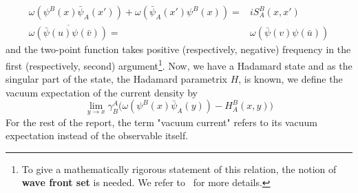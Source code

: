 \begin{equation}\label{vacuum-hadamardcond}
\begin{split}
\omega(\psi^B(x)\bar{\psi}_A(x')) + \omega(\bar{\psi}_A(x')\psi^B(x)) = &
iS^B_A(x,x') \\
\overline{\omega(\bar{\psi}(u)\psi(\bar{v}))} = & \omega(\bar{\psi}(v)\psi(\bar{u}))
\end{split}
\end{equation}
and the two-point function takes positive (respectively, negative) frequency in the first (respectively, second) argument\footnote{
To give a mathematically rigorous statement of this relation, 
the notion of \textbf{wave front set} is needed. 
We refer to~\cite{Radzikowski1996} for more details.
}.
Now, we have a Hadamard state and as the singular part of the state, the Hadamard parametrix $H$, is known, we define the vacuum expectation of the current density by 
\begin{equation}\label{vacuum-currentexpression}
\lim_{y \rightarrow x} \gamma^A_B \big(
\omega(\psi^B(x)\bar{\psi}_A(y)) - H^B_A (x, y)\big)
\end{equation}
For the rest of the report, the term "vacuum current" refers to its vacuum expectation instead of the observable itself. 
%
